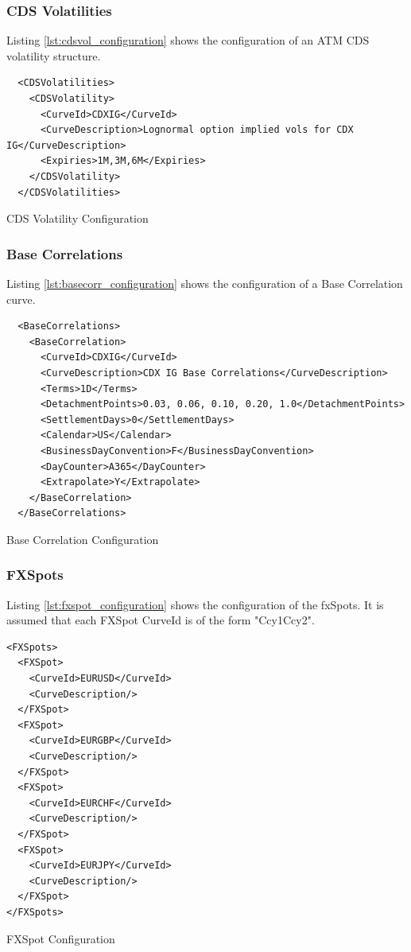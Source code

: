 \documentclass[12pt, a4paper]{article}
\newenvironment{longlisting}{\captionsetup{type=listing}}{}
\begin{document}
\subsubsection{CDS Volatilities}

Listing \ref{lst:cdsvol_configuration} shows the configuration of an ATM CDS volatility structure.

\begin{longlisting}
\begin{verbatim}
  <CDSVolatilities>
    <CDSVolatility>
      <CurveId>CDXIG</CurveId>
      <CurveDescription>Lognormal option implied vols for CDX IG</CurveDescription>
      <Expiries>1M,3M,6M</Expiries>
    </CDSVolatility>
  </CDSVolatilities>
\end{verbatim}
\caption{CDS Volatility Configuration}
\label{lst:cdsvol_configuration}
\end{longlisting}

\subsubsection{Base Correlations}

Listing \ref{lst:basecorr_configuration} shows the configuration of a Base Correlation curve.

\begin{longlisting}
\begin{verbatim}
  <BaseCorrelations>
    <BaseCorrelation>
      <CurveId>CDXIG</CurveId>
      <CurveDescription>CDX IG Base Correlations</CurveDescription>
      <Terms>1D</Terms>
      <DetachmentPoints>0.03, 0.06, 0.10, 0.20, 1.0</DetachmentPoints>
      <SettlementDays>0</SettlementDays>
      <Calendar>US</Calendar>
      <BusinessDayConvention>F</BusinessDayConvention>
      <DayCounter>A365</DayCounter>
      <Extrapolate>Y</Extrapolate>
    </BaseCorrelation>
  </BaseCorrelations>
\end{verbatim}
\caption{Base Correlation Configuration}
\label{lst:basecorr_configuration}
\end{longlisting}

\subsubsection{FXSpots}

Listing \ref{lst:fxspot_configuration} shows the configuration of the fxSpots. It is assumed that each FXSpot CurveId is of
the form "Ccy1Ccy2".
\begin{longlisting}
\begin{verbatim}
<FXSpots>
  <FXSpot>
    <CurveId>EURUSD</CurveId>
    <CurveDescription/>
  </FXSpot>
  <FXSpot>
    <CurveId>EURGBP</CurveId>
    <CurveDescription/>
  </FXSpot>
  <FXSpot>
    <CurveId>EURCHF</CurveId>
    <CurveDescription/>
  </FXSpot>
  <FXSpot>
    <CurveId>EURJPY</CurveId>
    <CurveDescription/>
  </FXSpot>
</FXSpots>
\end{verbatim}
\caption{FXSpot Configuration}
\label{lst:fxspot_configuration}
\end{longlisting}
\end{document}
